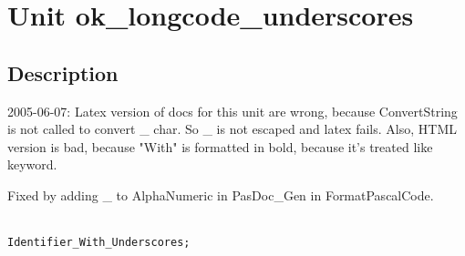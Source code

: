 \documentclass{report}
\begin{document}
\newlength{\tmplength}
\chapter{Unit ok{\_}longcode{\_}underscores}
\section{Description}
2005{-}06{-}07: Latex version of docs for this unit are wrong, because ConvertString is not called to convert {\_} char. So {\_} is not escaped and latex fails. Also, HTML version is bad, because "With" is formatted in bold, because it's treated like keyword.

Fixed by adding {\_} to AlphaNumeric in PasDoc{\_}Gen in FormatPascalCode.

\texttt{\\\nopagebreak[3]
Identifier{\_}With{\_}Underscores;\\
}
\end{document}
